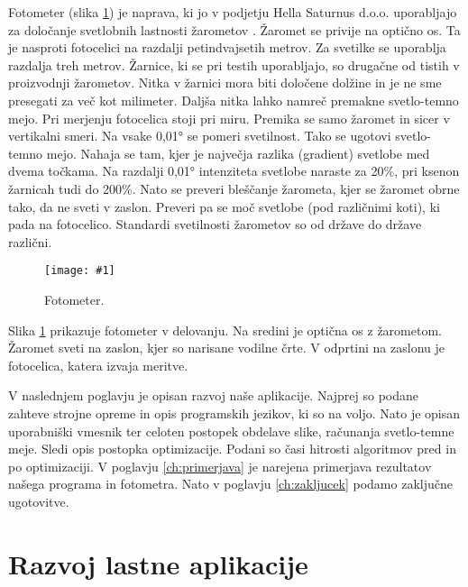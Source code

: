 \documentclass[oneside, a4paper, 12pt]{book}
\newcommand{\slika}[3]{
	\begin{figure}
	\begin{center}
	\texttt{[image: \#1]}
	\end{center}
	\vspace{-20pt}
	\caption{#2}
	\label{#3}
	\end{figure}
}
\begin{document}
Fotometer (slika \ref{pic:fotometer}) je naprava, ki jo v podjetju Hella Saturnus d.o.o. uporabljajo za določanje svetlobnih lastnosti žarometov \cite{hella-fotometer}. Žaromet se privije na optično os. Ta je nasproti fotocelici na razdalji petindvajsetih metrov. Za svetilke se uporablja razdalja treh metrov. Žarnice, ki se pri testih uporabljajo, so drugačne od tistih v proizvodnji žarometov. Nitka v žarnici mora biti določene dolžine in je ne sme presegati za več kot milimeter. Daljša nitka lahko namreč premakne svetlo-temno mejo. Pri merjenju fotocelica stoji pri miru. Premika se samo žaromet in sicer v vertikalni smeri. Na vsake 0,01° se pomeri svetilnost. Tako se ugotovi svetlo-temno mejo. Nahaja se tam, kjer je največja razlika (gradient) svetlobe med dvema točkama. Na razdalji 0,01° intenziteta svetlobe naraste za 20\%, pri ksenon žarnicah tudi do 200\%. Nato se preveri bleščanje žarometa, kjer se žaromet obrne tako, da ne sveti v zaslon. Preveri pa se moč svetlobe (pod različnimi koti), ki pada na fotocelico. Standardi svetilnosti žarometov so od države do države različni. 

\slika{slike/Photometer.jpg}{Fotometer.}{pic:fotometer}
Slika \ref{pic:fotometer} prikazuje fotometer v delovanju. Na sredini je optična os z žarometom. Žaromet sveti na zaslon, kjer so narisane vodilne črte. V odprtini na zaslonu je fotocelica, katera izvaja meritve.

V naslednjem poglavju je opisan razvoj naše aplikacije. Najprej so podane zahteve strojne opreme in opis programskih jezikov, ki so na voljo. Nato je opisan uporabniški vmesnik ter celoten postopek obdelave slike, računanja svetlo-temne meje. Sledi opis postopka optimizacije. Podani so časi hitrosti algoritmov pred in po optimizaciji. V poglavju \ref{ch:primerjava} je narejena primerjava rezultatov našega programa in fotometra. Nato v poglavju \ref{ch:zakljucek} podamo zaključne ugotovitve.

\chapter{Razvoj lastne aplikacije}
\end{document}

